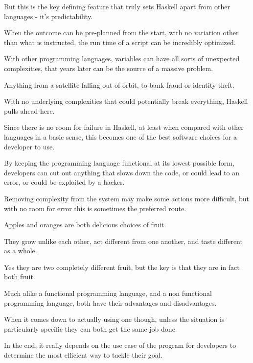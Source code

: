 \documentclass{article}
\begin{document}
\medskip\noindent
But this is the key defining feature that truly sets Haskell apart from other languages - it's predictability. 

\medskip\noindent
When the outcome can be pre-planned from the start, with no variation other than what is instructed, the run time of a script can be incredibly optimized.

\medskip\noindent
With other programming languages, variables can have all sorts of unexpected complexities, that years later can be the source of a massive problem.

\medskip\noindent
Anything from a satellite falling out of orbit, to bank fraud or identity theft. 

\medskip\noindent
With no underlying complexities that could potentially break everything, Haskell pulls ahead here.

\medskip\noindent
Since there is no room for failure in Haskell, at least when compared with other languages in a basic sense, this becomes one of the best software choices for a developer to use.

\medskip\noindent
By keeping the programming language functional at its lowest possible form, developers can cut out anything that slows down the code, or could lead to an error, or could be exploited by a hacker.

\medskip\noindent
Removing complexity from the system may make some actions more difficult, but with no room for error this is sometimes the preferred route.

\medskip\noindent
Apples and oranges are both delicious choices of fruit.

\medskip\noindent
They grow unlike each other, act different from one another, and taste different as a whole.

\medskip\noindent
Yes they are two completely different fruit, but the key is that they are in fact both fruit.

\medskip\noindent
Much alike a functional programming language, and a non functional programming language, both have their advantages and disadvantages.

\medskip\noindent
When it comes down to actually using one though, unless the situation is particularly specific they can both get the same job done.

\medskip\noindent
In the end, it really depends on the use case of the program for developers to determine the most efficient way to tackle their goal.
\end{document}
